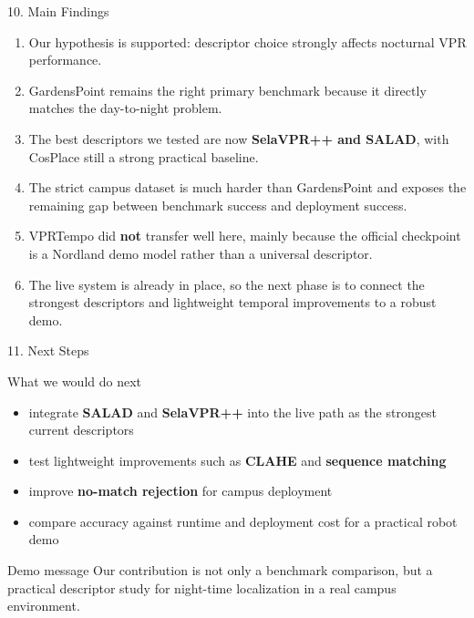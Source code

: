 \documentclass[aspectratio=169,10pt]{beamer}
\begin{document}
\begin{frame}[t,shrink=10]{10. Main Findings}
  \begin{enumerate}
    \item Our hypothesis is supported: descriptor choice strongly affects nocturnal VPR performance.
    \item GardensPoint remains the right primary benchmark because it directly matches the day-to-night problem.
    \item The best descriptors we tested are now \textbf{SelaVPR++ and SALAD}, with CosPlace still a strong practical baseline.
    \item The strict campus dataset is much harder than GardensPoint and exposes the remaining gap between benchmark success and deployment success.
    \item VPRTempo did \textbf{not} transfer well here, mainly because the official checkpoint is a Nordland demo model rather than a universal descriptor.
    \item The live system is already in place, so the next phase is to connect the strongest descriptors and lightweight temporal improvements to a robust demo.
  \end{enumerate}
\end{frame}

\begin{frame}[t,shrink=4]{11. Next Steps}
  \begin{block}{What we would do next}
    \small
    \begin{itemize}
      \item integrate \textbf{SALAD} and \textbf{SelaVPR++} into the live path as the strongest current descriptors
      \item test lightweight improvements such as \textbf{CLAHE} and \textbf{sequence matching}
      \item improve \textbf{no-match rejection} for campus deployment
      \item compare accuracy against runtime and deployment cost for a practical robot demo
    \end{itemize}
  \end{block}

  \vspace{0.6em}
  \begin{block}{Demo message}
    \small
    Our contribution is not only a benchmark comparison, but a practical descriptor study for night-time localization in a real campus environment.
  \end{block}
\end{frame}
\end{document}
